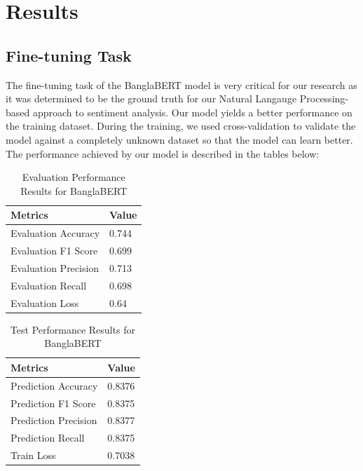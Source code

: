 \chapter{Results}\label{results}

\section{Fine-tuning Task}
The fine-tuning task of the BanglaBERT model is very critical for our research as it was determined to be the ground truth for our Natural Langauge Processing-based approach to sentiment analysis. Our model yields a better performance on the training dataset. During the training, we used cross-validation to validate the model against a completely unknown dataset so that the model can learn better. The performance achieved by our model is described in the tables below:

\begin{table}[H]
    \begin{center}
        \begin{tabular}{|l|l|}
        \hline
            \textbf{Metrics}     &   \textbf{Value}  \\ \hline
            Evaluation Accuracy  &   0.744           \\  \hline    
            Evaluation F1 Score  &   0.699           \\  \hline    
            Evaluation Precision &   0.713           \\  \hline    
            Evaluation Recall    &   0.698           \\  \hline    
            Evaluation Loss      &   0.64           \\  \hline    
        \end{tabular}
        \caption{Evaluation Performance Results for BanglaBERT}
        \label{table_banglabert_eval}
    \end{center}
\end{table}

\begin{table}[H]
    \begin{center}
        \begin{tabular}{|l|l|}
        \hline
            \textbf{Metrics}     &   \textbf{Value}  \\ \hline
            Prediction Accuracy  &   0.8376           \\  \hline    
            Prediction F1 Score  &   0.8375           \\  \hline    
            Prediction Precision &   0.8377           \\  \hline    
            Prediction Recall    &   0.8375           \\  \hline
            Train Loss           &   0.7038           \\  \hline    
        \end{tabular}
        \caption{Test Performance Results for BanglaBERT}
        \label{table_banglabert_test}
    \end{center}
\end{table}



